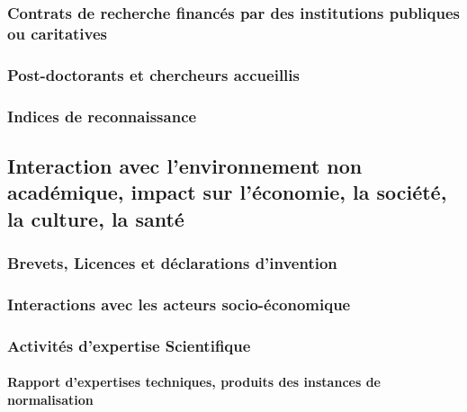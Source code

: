 \subsubsection{Contrats de recherche financés par des institutions publiques ou caritatives}


\subsubsection{Post-doctorants et chercheurs accueillis}

\subsubsection{Indices de reconnaissance}


\subsection{Interaction avec l'environnement non académique, impact sur l'économie, la société, la culture, la santé}


\subsubsection{Brevets, Licences et déclarations d'invention}
\subsubsection{Interactions avec les acteurs socio-économique}	

\subsubsection{Activités d'expertise Scientifique}	

	\paragraph*{Rapport d'expertises techniques, produits des instances de normalisation}
	~~\\  
